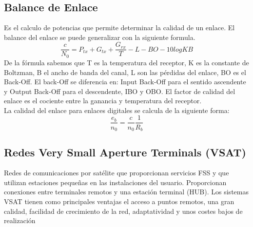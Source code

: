 	\subsection{Balance de Enlace}
	\label{sub:balance}
		Es el calculo de potencias que permite determinar la calidad de un enlace. El balance del enlace se puede generalizar con la siguiente formula.
		\begin{equation}
			\tag{Balance de enlace}
			\frac{c}{N_0}=P_{tx}+G_{tx}+\frac{G_{rx}}{T}-L-BO-10logKB
		\end{equation}
		De la fórmula sabemos que T es la temperatura del receptor, K es la constante de Boltzman, B el ancho de banda del canal, L son las pérdidas del enlace, BO es el Back-Off. El back-Off se diferencia en: Input Back-Off para el sentido ascendente y Output Back-Off para el descendente, IBO y OBO. El factor de calidad del enlace es el cociente entre la ganancia y temperatura del receptor.\\
		La calidad del enlace para enlaces digitales se calcula de la siguiente forma:
		\begin{equation}
			\tag{Balance de enlace digital}
			\frac{e_b}{n_0}=\frac{c}{n_0}\frac{1}{R_b}
		\end{equation}
	\subsection{Redes Very Small Aperture Terminals (VSAT)}
\label{sub:vsat}
	Redes de comunicaciones por satélite que proporcionan servicios FSS y que utilizan estaciones pequeñas en las instalaciones del usuario. Proporcionan conexiones entre terminales remotos y una estación terminal (HUB). Los sistemas VSAT tienen como principales ventajas el acceso a puntos remotos, una gran calidad, facilidad de crecimiento de la red, adaptatividad y unos costes bajos de realización
